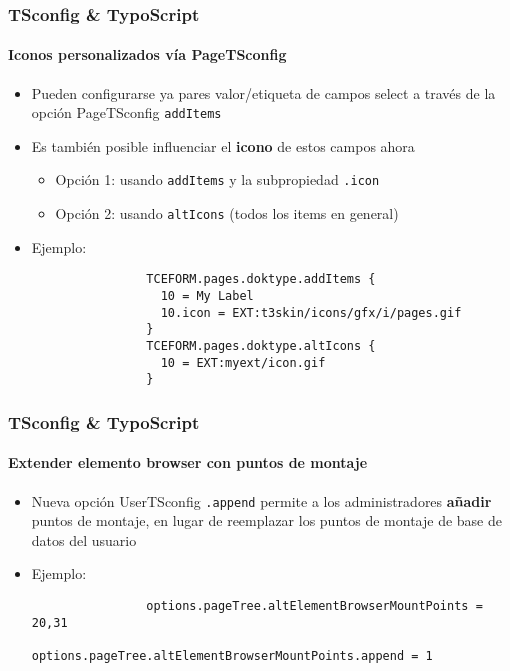 \begin{frame}[fragile]
	\frametitle{TSconfig \& TypoScript}
	\framesubtitle{Iconos personalizados vía PageTSconfig}

	\begin{itemize}
		\item Pueden configurarse ya pares valor/etiqueta de campos select a través de la opción PageTSconfig \texttt{addItems}
		\item Es también posible influenciar el \textbf{icono} de estos campos ahora

			\begin{itemize}
				\item Opción 1: usando \texttt{addItems} y la subpropiedad \texttt{.icon}
				\item Opción 2: usando \texttt{altIcons} (todos los items en general)
			\end{itemize}

		\item Ejemplo:

			\begin{lstlisting}
				TCEFORM.pages.doktype.addItems {
				  10 = My Label
				  10.icon = EXT:t3skin/icons/gfx/i/pages.gif
				}
				TCEFORM.pages.doktype.altIcons {
				  10 = EXT:myext/icon.gif
				}
			\end{lstlisting}

	\end{itemize}

\end{frame}


\begin{frame}[fragile]
	\frametitle{TSconfig \& TypoScript}
	\framesubtitle{Extender elemento browser con puntos de montaje}

	\begin{itemize}
		\item Nueva opción UserTSconfig \texttt{.append} permite a los administradores \textbf{añadir}
			puntos de montaje, en lugar de reemplazar los puntos de montaje de base de datos del usuario

		\item Ejemplo:

			\begin{lstlisting}
				options.pageTree.altElementBrowserMountPoints = 20,31
				options.pageTree.altElementBrowserMountPoints.append = 1
			\end{lstlisting}

	\end{itemize}

\end{frame}

